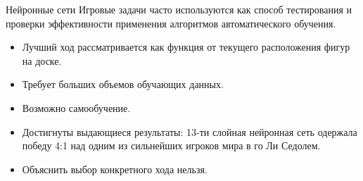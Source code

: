 \begin{frame}{Нейронные сети}
Игровые задачи часто используются как способ тестирования и проверки эффективности применения алгоритмов автоматического обучения\footnotemark{}. 
\begin{itemize}
\item Лучший ход рассматривается как функция от текущего расположения фигур на доске.
\item Требует больших объемов обучающих данных.
\item Возможно самообучение.
\item Достигнуты выдающиеся результаты: 13-ти слойная нейронная сеть
  одержала победу 4:1 над одним из сильнейших игроков мира в го Ли
  Седолем.
\item Объяснить выбор конкретного хода нельзя.
\end{itemize}
\end{frame}
